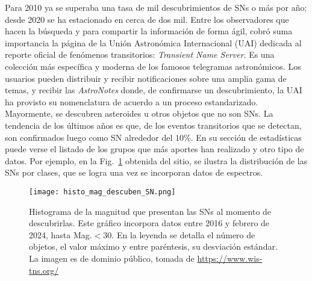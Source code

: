 \documentclass[baaa]{baaa}
\begin{document}
Para 2010 ya se superaba una tasa de mil descubrimientos de SNs o más por año; desde 2020 se ha estacionado en cerca de dos mil.
Entre los observadores que hacen la búsqueda y para compartir la información de forma ágil, cobró suma importancia la página de la Unión Astronómica Internacional (UAI) dedicada al reporte oficial de fenómenos transitorios: {\em Transient Name Server}.
Es una colección más específica y moderna de los famosos telegramas astronómicos.
Los usuarios pueden  distribuir y recibir notificaciones sobre una amplia gama de temas, y recibir las {\em AstroNotes} donde, de confirmarse un descubrimiento, la UAI ha provisto su nomenclatura de acuerdo a un proceso estandarizado.
Mayormente, se descubren asteroides u otros objetos que no son SNs.
La tendencia de los últimos años es que, de los eventos transitorios que se detectan, son confirmados luego como SN alrededor del $10\%$. En su sección de estadísticas puede verse el listado de los grupos que más aportes han realizado y otro tipo de datos. Por ejemplo, en la Fig.~\ref{clase} obtenida del sitio, se ilustra la distribución de las SNs por clases, que se logra una vez se incorporan datos de espectros.

\begin{figure}[!h]
\centering
\texttt{[image: histo\_mag\_descuben\_SN.png]}
\caption{Histograma de la magnitud que presentan las SNs al momento de descubrirlas. Este gráfico incorpora datos entre 2016 y febrero de 2024, hasta Mag.$< 30$. En la leyenda se detalla el número de objetos, el valor máximo y entre paréntesis, su desviación estándar. La imagen es de dominio público, tomada de \url{https://www.wis-tns.org/}}
\label{clase}
\end{figure}
\end{document}
